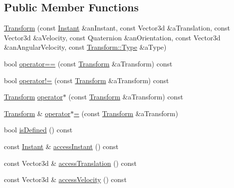 \subsection*{Public Member Functions}
\begin{DoxyCompactItemize}
\item 
\hyperlink{classlibrary_1_1physics_1_1coord_1_1_transform_ac4b91f8f159f3319174e091cf6103cf9}{Transform} (const \hyperlink{classlibrary_1_1physics_1_1time_1_1_instant}{Instant} \&an\+Instant, const Vector3d \&a\+Translation, const Vector3d \&a\+Velocity, const Quaternion \&an\+Orientation, const Vector3d \&an\+Angular\+Velocity, const \hyperlink{classlibrary_1_1physics_1_1coord_1_1_transform_a4f19d7d232ce1fda0dcee16e4157db2c}{Transform\+::\+Type} \&a\+Type)
\item 
bool \hyperlink{classlibrary_1_1physics_1_1coord_1_1_transform_a7fd14bfb2953041a020521c3b34c5309}{operator==} (const \hyperlink{classlibrary_1_1physics_1_1coord_1_1_transform}{Transform} \&a\+Transform) const
\item 
bool \hyperlink{classlibrary_1_1physics_1_1coord_1_1_transform_a0481b3053d7dfb4a3cfc7ced3a13dc68}{operator!=} (const \hyperlink{classlibrary_1_1physics_1_1coord_1_1_transform}{Transform} \&a\+Transform) const
\item 
\hyperlink{classlibrary_1_1physics_1_1coord_1_1_transform}{Transform} \hyperlink{classlibrary_1_1physics_1_1coord_1_1_transform_a61e4d3b1cbbebb7e882f421d2f732d64}{operator$\ast$} (const \hyperlink{classlibrary_1_1physics_1_1coord_1_1_transform}{Transform} \&a\+Transform) const
\item 
\hyperlink{classlibrary_1_1physics_1_1coord_1_1_transform}{Transform} \& \hyperlink{classlibrary_1_1physics_1_1coord_1_1_transform_af0e36a56b799db736bd4e2228a48a8e6}{operator$\ast$=} (const \hyperlink{classlibrary_1_1physics_1_1coord_1_1_transform}{Transform} \&a\+Transform)
\item 
bool \hyperlink{classlibrary_1_1physics_1_1coord_1_1_transform_a782bf485d01d3ff9b38cabe94ff9406f}{is\+Defined} () const
\item 
const \hyperlink{classlibrary_1_1physics_1_1time_1_1_instant}{Instant} \& \hyperlink{classlibrary_1_1physics_1_1coord_1_1_transform_aaa29bb2f60c383af21967078ed90fa6e}{access\+Instant} () const
\item 
const Vector3d \& \hyperlink{classlibrary_1_1physics_1_1coord_1_1_transform_a18fcdf0a8123a3e6a2551b93830fb909}{access\+Translation} () const
\item 
const Vector3d \& \hyperlink{classlibrary_1_1physics_1_1coord_1_1_transform_a376d079de305b16e05251bfe84ca2199}{access\+Velocity} () const

\end{DoxyCompactItemize}
